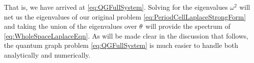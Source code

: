 That is, we have arrived at \eqref{eq:QGFullSystem}.
Solving for the eigenvalues $\omega^2$ will net us the eigenvalues of our original problem \eqref{eq:PeriodCellLaplaceStrongForm} and taking the union of the eigenvalues over $\theta$ will provide the spectrum of \eqref{eq:WholeSpaceLaplaceEqn}.
As will be made clear in the discussion that follows, the quantum graph problem \eqref{eq:QGFullSystem} is much easier to handle both analytically and numerically.